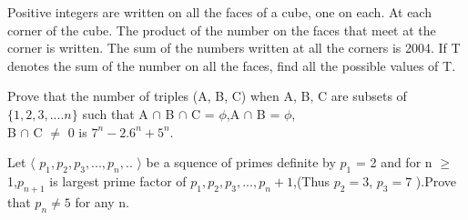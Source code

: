 \item Positive integers are written on all the faces of a cube, one on each. At each corner of the cube. The product of the number on the faces that meet at the corner is written. The sum of the numbers written at all the corners is 2004. If T denotes the sum of the number on all the faces, find all the possible values of T.

\item Prove that the number of triples (A, B, C) when A, B, C are subsets of $\{1,2,3,....n\}$ such that 
A $\cap$ B $\cap$ C = $\phi$,A $\cap$ B = $\phi$,\\B $\cap$ C $\neq$ 0 is $7^n - 2.6^n + 5^n$.

\item Let $\langle$ $p_1, p_2, p_3,...,p_n,..$ $\rangle$ be a squence of primes definite by $p_1$ = 2 and for n $\geq$ 1,$p_{n+1}$ is largest prime factor of $p_1, p_2, p_3,...,p_n+1$,(Thus $p_2=3$, $p_3=7$ ).Prove that $p_n \neq 5$ for any n.
